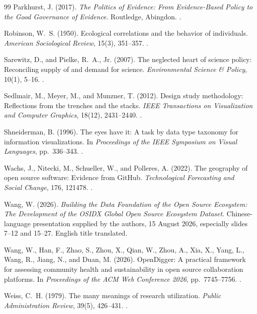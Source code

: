 \begin{thebibliography}{99}
Parkhurst, J. (2017).
\emph{The Politics of Evidence: From Evidence-Based Policy to the Good Governance of Evidence}.
Routledge, Abingdon.
.

Robinson, W.~S. (1950).
Ecological correlations and the behavior of individuals.
\emph{American Sociological Review}, 15(3), 351--357.
.

Sarewitz, D., and Pielke, R.~A., Jr. (2007).
The neglected heart of science policy: Reconciling supply of and demand for science.
\emph{Environmental Science \& Policy}, 10(1), 5--16.
.

Sedlmair, M., Meyer, M., and Munzner, T. (2012).
Design study methodology: Reflections from the trenches and the stacks.
\emph{IEEE Transactions on Visualization and Computer Graphics}, 18(12), 2431--2440.
.

Shneiderman, B. (1996).
The eyes have it: A task by data type taxonomy for information visualizations.
In \emph{Proceedings of the IEEE Symposium on Visual Languages}, pp.~336--343.
.

Wachs, J., Nitecki, M., Schueller, W., and Polleres, A. (2022).
The geography of open source software: Evidence from GitHub.
\emph{Technological Forecasting and Social Change}, 176, 121478.
.

Wang, W. (2026).
\emph{Building the Data Foundation of the Open Source Ecosystem: The Development of the OSIDX Global Open Source Ecosystem Dataset}.
Chinese-language presentation supplied by the authors, 15 August 2026, especially slides 7--12 and 15--27. English title translated.

Wang, W., Han, F., Zhao, S., Zhou, X., Qian, W., Zhou, A., Xia, X., Yang, L., Wang, R., Jiang, N., and Duan, M. (2026).
OpenDigger: A practical framework for assessing community health and sustainability in open source collaboration platforms.
In \emph{Proceedings of the ACM Web Conference 2026}, pp.~7745--7756.
.

Weiss, C.~H. (1979).
The many meanings of research utilization.
\emph{Public Administration Review}, 39(5), 426--431.
.


\end{thebibliography}
